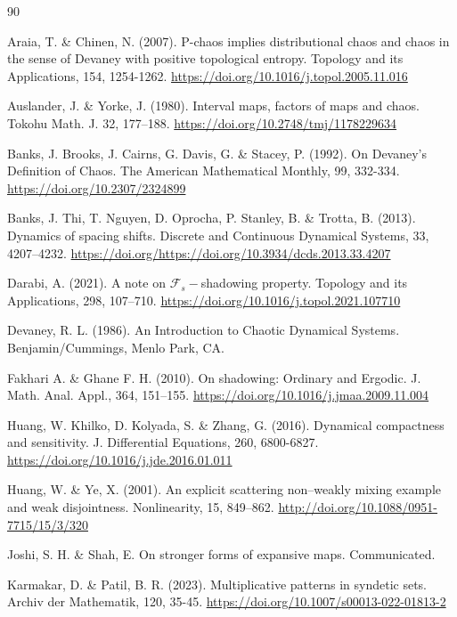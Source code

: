 \documentclass{amsart}[12pt, papera4]
\theoremstyle{definition}
\theoremstyle{remark}
\numberwithin{equation}{section}
\def\F{{\mathscr{F}}}
\begin{document}
	
	\begin{thebibliography}{90}
		
		Araia, T. \& Chinen, N. (2007). P-chaos implies distributional chaos and chaos in the sense of Devaney with positive topological entropy. Topology and its Applications, 154, 1254-1262. \url{https://doi.org/10.1016/j.topol.2005.11.016}
		
		Auslander, J. \& Yorke, J. (1980). Interval maps, factors of maps and chaos. Tokohu Math. J. 32, 177--188. \url{https://doi.org/10.2748/tmj/1178229634}
		
		Banks, J. Brooks, J. Cairns, G. Davis, G. \& Stacey, P. (1992). On Devaney's Definition of Chaos. The American Mathematical Monthly, 99, 332-334. \url{https://doi.org/10.2307/2324899}
		
		Banks, J. Thi, T. Nguyen, D. Oprocha, P. Stanley, B. \& Trotta, B. (2013). Dynamics of spacing shifts. Discrete and Continuous Dynamical Systems, 33, 4207--4232. \url{https://doi.org/https://doi.org/10.3934/dcds.2013.33.4207}
		
		Darabi, A. (2021). A note on $\F_s-$shadowing property. Topology and its Applications, 298, 107--710. \url{https://doi.org/10.1016/j.topol.2021.107710}
		
		Devaney, R. L. (1986). An Introduction to Chaotic Dynamical Systems. Benjamin/Cummings, Menlo Park, CA.
		
		Fakhari A. \& Ghane F. H. (2010). On shadowing: Ordinary and Ergodic. J. Math. Anal. Appl., 364, 151--155. \url{https://doi.org/10.1016/j.jmaa.2009.11.004}
		
		Huang, W. Khilko, D. Kolyada, S. \& Zhang, G. (2016). Dynamical compactness and sensitivity. J. Differential Equations, 260, 6800-6827. \url{https://doi.org/10.1016/j.jde.2016.01.011}
		
		Huang, W. \& Ye, X. (2001). An explicit scattering non--weakly mixing example and weak disjointness. Nonlinearity, 15, 849--862. \url{http://doi.org/10.1088/0951-7715/15/3/320}
		
		Joshi, S. H. \& Shah, E. On stronger forms of expansive maps. Communicated.
		
		Karmakar, D. \& Patil, B. R. (2023). Multiplicative patterns in syndetic sets. Archiv der Mathematik, 120, 35-45. \url{https://doi.org/10.1007/s00013-022-01813-2}
		

\end{thebibliography}
\end{document}
